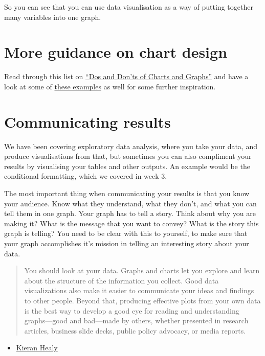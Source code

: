 \documentclass[]{book}
\providecommand{\tightlist}{%
  \setlength{\itemsep}{0pt}\setlength{\parskip}{0pt}}
\theoremstyle{definition}
\theoremstyle{definition}
\theoremstyle{definition}
\theoremstyle{remark}
\begin{document}
So you can see that you can use data visualisation as a way of putting
together many variables into one graph.

\hypertarget{more-guidance-on-chart-design}{%
\section{More guidance on chart
design}\label{more-guidance-on-chart-design}}

Read through this list on
\href{https://guides.library.duke.edu/datavis/topten}{``Dos and Don'ts
of Charts and Graphs''} and have a look at some of
\href{http://datajournalismhandbook.org/1.0/en/introduction_3.html}{these
examples} as well for some further inspiration.

\hypertarget{communicating-results}{%
\section{Communicating results}\label{communicating-results}}

We have been covering exploratory data analysis, where you take your
data, and produce visualisations from that, but sometimes you can also
compliment your results by visualising your tables and other outputs. An
example would be the conditional formatting, which we covered in week 3.

The most important thing when communicating your results is that you
know your audience. Know what they understand, what they don't, and what
you can tell them in one graph. Your graph has to tell a story. Think
about why you are making it? What is the message that you want to
convey? What is the story this graph is telling? You need to be clear
with this to yourself, to make sure that your graph accomplishes it's
mission in telling an interesting story about your data.

\begin{quote}
You should look at your data. Graphs and charts let you explore and
learn about the structure of the information you collect. Good data
visualizations also make it easier to communicate your ideas and
findings to other people. Beyond that, producing effective plots from
your own data is the best way to develop a good eye for reading and
understanding graphs---good and bad---made by others, whether presented
in research articles, business slide decks, public policy advocacy, or
media reports.
\end{quote}

\begin{itemize}
\tightlist
\item
  \href{http://socviz.co/}{Kieran Healy}
\end{itemize}
\end{document}
